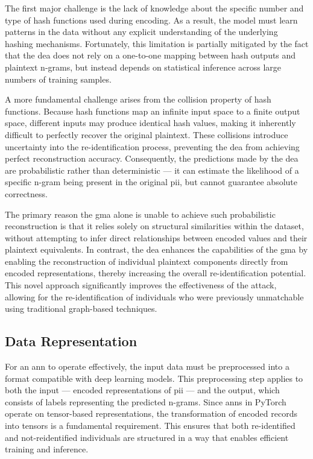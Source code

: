 The first major challenge is the lack of knowledge about the specific number and type of hash functions used during encoding.
As a result, the model must learn patterns in the data without any explicit understanding of the underlying hashing mechanisms.
Fortunately, this limitation is partially mitigated by the fact that the \ac{dea} does not rely on a one-to-one mapping between hash outputs and plaintext n-grams, but instead depends on statistical inference across large numbers of training samples.

A more fundamental challenge arises from the collision property of hash functions.
Because hash functions map an infinite input space to a finite output space, different inputs may produce identical hash values, making it inherently difficult to perfectly recover the original plaintext.
These collisions introduce uncertainty into the re-identification process, preventing the \ac{dea} from achieving perfect reconstruction accuracy.
Consequently, the predictions made by the \ac{dea} are probabilistic rather than deterministic — it can estimate the likelihood of a specific n-gram being present in the original \ac{pii}, but cannot guarantee absolute correctness.

The primary reason the \ac{gma} alone is unable to achieve such probabilistic reconstruction is that it relies solely on structural similarities within the dataset, without attempting to infer direct relationships between encoded values and their plaintext equivalents.
In contrast, the \ac{dea} enhances the capabilities of the \ac{gma} by enabling the reconstruction of individual plaintext components directly from encoded representations, thereby increasing the overall re-identification potential.
This novel approach significantly improves the effectiveness of the attack, allowing for the re-identification of individuals who were previously unmatchable using traditional graph-based techniques.

\subsection{Data Representation} \label{sec:representation}

For an \ac{ann} to operate effectively, the input data must be preprocessed into a format compatible with deep learning models.
This preprocessing step applies to both the input — encoded representations of \ac{pii} — and the output, which consists of labels representing the predicted n-grams.
Since \ac{ann}s in PyTorch operate on tensor-based representations, the transformation of encoded records into tensors is a fundamental requirement.
This ensures that both re-identified and not-reidentified individuals are structured in a way that enables efficient training and inference.

